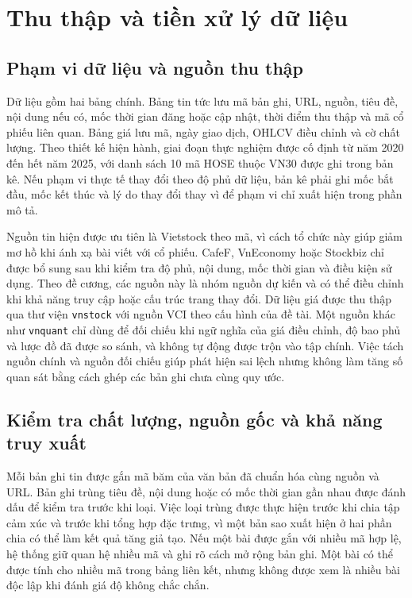 \section{Thu thập và tiền xử lý dữ liệu}
\label{sec:pp-du-lieu}

\subsection{Phạm vi dữ liệu và nguồn thu thập}

Dữ liệu gồm hai bảng chính. Bảng tin tức lưu mã bản ghi, URL, nguồn, tiêu đề, nội
dung nếu có, mốc thời gian đăng hoặc cập nhật, thời điểm thu thập và mã cổ phiếu liên
quan. Bảng giá lưu mã, ngày giao dịch, OHLCV điều chỉnh và cờ chất lượng. Theo thiết
kế hiện hành, giai đoạn thực nghiệm được cố định từ năm 2020 đến hết năm 2025, với danh
sách 10 mã HOSE thuộc VN30 được ghi trong bản kê. Nếu phạm vi thực tế thay đổi theo độ
phủ dữ liệu, bản kê phải ghi mốc bắt đầu, mốc kết thúc và lý do thay đổi thay vì để
phạm vi chỉ xuất hiện trong phần mô tả.

Nguồn tin hiện được ưu tiên là Vietstock theo mã, vì cách tổ chức này giúp giảm mơ hồ
khi ánh xạ bài viết với cổ phiếu. CafeF, VnEconomy hoặc Stockbiz chỉ được bổ sung sau
khi kiểm tra độ phủ, nội dung, mốc thời gian và điều kiện sử dụng. Theo đề cương, các
nguồn này là nhóm nguồn dự kiến và có thể điều chỉnh khi khả năng truy cập hoặc cấu
trúc trang thay đổi. Dữ liệu giá được thu thập qua thư viện \texttt{vnstock} với nguồn
VCI theo cấu hình của đề tài. Một nguồn khác như \texttt{vnquant} chỉ dùng để đối chiếu
khi ngữ nghĩa của giá điều chỉnh, độ bao phủ và lược đồ đã được so sánh, và không tự
động được trộn vào tập chính. Việc tách nguồn chính và nguồn đối chiếu giúp phát hiện
sai lệch nhưng không làm tăng số quan sát bằng cách ghép các bản ghi chưa cùng quy ước.

\subsection{Kiểm tra chất lượng, nguồn gốc và khả năng truy xuất}

Mỗi bản ghi tin được gắn mã băm của văn bản đã chuẩn hóa cùng nguồn và URL. Bản ghi
trùng tiêu đề, nội dung hoặc có mốc thời gian gần nhau được đánh dấu để kiểm tra trước
khi loại. Việc loại trùng được thực hiện trước khi chia tập cảm xúc và trước khi tổng
hợp đặc trưng, vì một bản sao xuất hiện ở hai phần chia có thể làm kết quả tăng giả
tạo. Nếu một bài được gắn với nhiều mã hợp lệ, hệ thống giữ quan hệ nhiều mã và ghi rõ
cách mở rộng bản ghi. Một bài có thể được tính cho nhiều mã trong bảng liên kết, nhưng
không được xem là nhiều bài độc lập khi đánh giá độ không chắc chắn.

